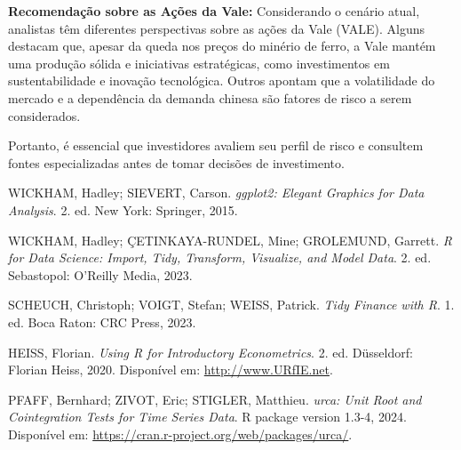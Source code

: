 \documentclass[a4paper,12pt]{article}[abntex2]
\begin{document}
\textbf{Recomendação sobre as Ações da Vale:} Considerando o cenário atual, analistas têm diferentes perspectivas sobre as ações da Vale (VALE). Alguns destacam que, apesar da queda nos preços do minério de ferro, a Vale mantém uma produção sólida e iniciativas estratégicas, como investimentos em sustentabilidade e inovação tecnológica. Outros apontam que a volatilidade do mercado e a dependência da demanda chinesa são fatores de risco a serem considerados.

Portanto, é essencial que investidores avaliem seu perfil de risco e consultem fontes especializadas antes de tomar decisões de investimento.

\newpage
\begin{thebibliography}{}

WICKHAM, Hadley; SIEVERT, Carson. \textit{ggplot2: Elegant Graphics for Data Analysis}. 2. ed. New York: Springer, 2015.

WICKHAM, Hadley; ÇETINKAYA-RUNDEL, Mine; GROLEMUND, Garrett. \textit{R for Data Science: Import, Tidy, Transform, Visualize, and Model Data}. 2. ed. Sebastopol: O'Reilly Media, 2023.

SCHEUCH, Christoph; VOIGT, Stefan; WEISS, Patrick. \textit{Tidy Finance with R}. 1. ed. Boca Raton: CRC Press, 2023.

HEISS, Florian. \textit{Using R for Introductory Econometrics}. 2. ed. Düsseldorf: Florian Heiss, 2020. Disponível em: \url{http://www.URfIE.net}.

PFAFF, Bernhard; ZIVOT, Eric; STIGLER, Matthieu. \textit{urca: Unit Root and Cointegration Tests for Time Series Data}. R package version 1.3-4, 2024. Disponível em: \url{https://cran.r-project.org/web/packages/urca/}.

\end{thebibliography}
\end{document}
